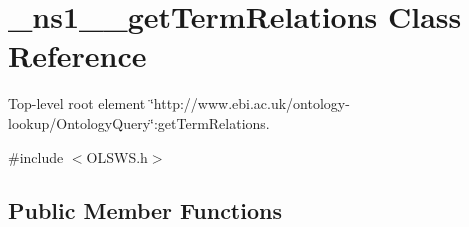 \hypertarget{class__ns1____getTermRelations}{
\section{\_\-ns1\_\-\_\-getTermRelations Class Reference}
\label{class__ns1____getTermRelations}
}


Top-\/level root element \char`\"{}http://www.ebi.ac.uk/ontology-\/lookup/OntologyQuery\char`\"{}:getTermRelations.  




{\ttfamily \#include $<$OLSWS.h$>$}

\subsection*{Public Member Functions}
